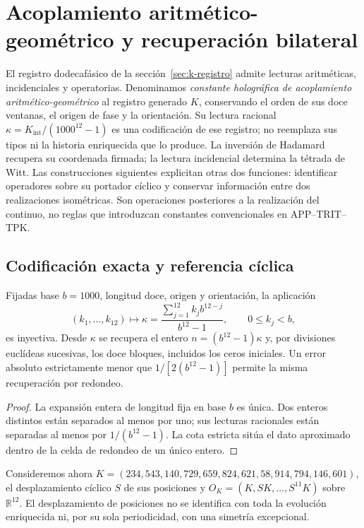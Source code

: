 \section{Acoplamiento aritmético-geométrico y recuperación bilateral}
\label{sec:acoplamiento-recuperacion}

El registro dodecafásico de la sección~\ref{sec:k-registro} admite
lecturas aritméticas, incidenciales y operatorias. Denominamos
\emph{constante holográfica de acoplamiento aritmético-geométrico}
al registro generado \(K\), conservando el orden de sus doce ventanas,
el origen de fase y la orientación. Su lectura racional
\(\kappa=K_{\mathrm{int}}/(1000^{12}-1)\) es una codificación de ese
registro; no reemplaza sus tipos ni la historia enriquecida que lo produce.
La inversión de Hadamard recupera su coordenada firmada; la lectura
incidencial determina la tétrada de Witt. Las construcciones siguientes
explicitan otras dos funciones: identificar operadores sobre su portador
cíclico y conservar información entre dos realizaciones isométricas.
Son operaciones posteriores a la realización del continuo, no reglas
que introduzcan constantes convencionales en APP--TRIT--TPK.

\subsection{Codificación exacta y referencia cíclica}
\label{subsec:acoplamiento-codigo}

\begin{proposition}
Fijadas base \(b=1000\), longitud doce, origen y orientación, la aplicación
\[
 (k_1,\ldots,k_{12})\longmapsto
 \kappa=\frac{\sum_{j=1}^{12}k_jb^{12-j}}{b^{12}-1},
 \qquad 0\leq k_j<b,
\]
es inyectiva. Desde \(\kappa\) se recupera el entero
\(n=(b^{12}-1)\kappa\) y, por divisiones euclídeas sucesivas, los doce
bloques, incluidos los ceros iniciales. Un error absoluto estrictamente
menor que \(1/[2(b^{12}-1)]\) permite la misma recuperación por redondeo.
\end{proposition}
\begin{proof}
La expansión entera de longitud fija en base \(b\) es única. Dos enteros
distintos están separados al menos por uno; sus lecturas racionales
están separadas al menos por \(1/(b^{12}-1)\). La cota estricta sitúa el
dato aproximado dentro de la celda de redondeo de un único entero.
\end{proof}

Consideremos ahora \(K=(234,543,140,729,659,824,621,58,914,794,146,601)\),
el desplazamiento cíclico \(S\) de sus posiciones y
\(O_K=(K,SK,\ldots,S^{11}K)\) sobre \(\mathbb R^{12}\).
El desplazamiento de posiciones no se identifica con toda la evolución
enriquecida ni, por su sola periodicidad, con una simetría excepcional.

